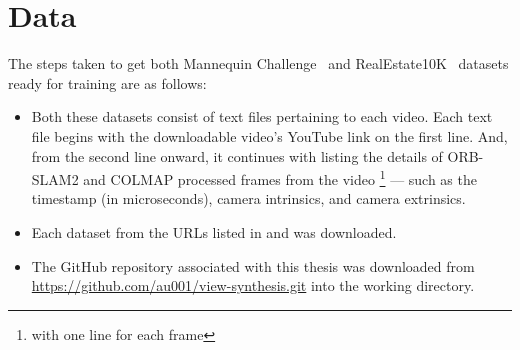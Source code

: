 \section{Data}\label{sec:data} 



The steps taken to get both Mannequin Challenge~\cite{li2019learning} and RealEstate10K~\cite{zhou2018stereo} datasets ready for training are as follows:


\begin{itemize}

    \item Both these datasets consist of text files pertaining to each video. Each text file begins with the downloadable video’s YouTube link on the first line. And, from the second line onward, it continues with listing the details of ORB-SLAM2 and COLMAP processed frames from the video \footnote{with one line for each frame} --- such as the timestamp (in microseconds), camera intrinsics, and camera extrinsics.
    
    \item Each dataset from the URLs listed in \cite{zhou2018stereo} and \cite{li2019learning} was downloaded. 
    
    \item The GitHub repository associated with this thesis was downloaded from \url{https://github.com/au001/view-synthesis.git} into the working directory.


\end{itemize}
